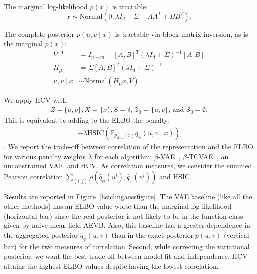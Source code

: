 The marginal log-likelihood $p(x)$ is tractable:
\begin{equation}
x \sim \textrm{Normal}(0, \lambda I_d + \Sigma + AA^T + BB^T). 
\end{equation}

The complete posterior $p(u, v \mid x)$ is tractable via block matrix inversion, as is the marginal $p(x)$:
\begin{equation}
\begin{split}
V^{-1} &= I_{n+m} + [A, B]^T (\lambda I_d + \Sigma)^{-1} [A, B]  \\
H_\mu &= \Sigma [A, B]^T (\lambda I_d + \Sigma)^{-1} \\
u, v \mid x &\sim \textrm{Normal}(H_\mu x, V). 
\end{split}
\end{equation}

We apply HCV with:
\begin{align}
    Z = \{u, v\}, X = \{x\}, S = \emptyset , \mathcal{Z}_0 = \{u, v\}\text{, and } \mathcal{S}_0 = \emptyset.
\end{align}
This is equivalent to adding to the ELBO the penalty:
\begin{align}
- \lambda \text{HSIC}(\mathbb{E}_{p_\text{data}(x)}q_\phi(u, v\mid x))
\end{align}. We report the trade-off between correlation of the representation and the ELBO for various penalty weights $\lambda$ for each algorithm: $\beta$-VAE~\cite{Higgins2017}, $\beta$-TCVAE~\cite{betatcVAE}, an unconstrained VAE, and HCV. As correlation measures, we consider the summed Pearson correlation $\sum_{(i, j)}\rho(\hat{q}_\phi(u^i), \hat{q}_\phi(v^j))$ and HSIC.



Results are reported in Figure~\ref{hsiclingaussfigure}. The VAE baseline (like all the other methods) has an ELBO value worse than the marginal log-likelihood (horizontal bar) since the real posterior is not likely to be in the function class given by naive mean field AEVB. Also, this baseline has a greater dependence in the aggregated posterior $\hat{q}_\phi(u, v)$ than in the exact posterior $\hat{p}(u, v)$ (vertical bar) for the two measures of correlation. Second, while correcting the variational posterior, we want the best trade-off between model fit and independence. HCV attains the highest ELBO values despite having the lowest correlation. 







